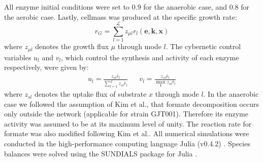 \documentclass[10pt,twocolumn,twoside,final]{IEEEtran}
\begin{document}
All enzyme initial conditions were set to 0.9 for the anaerobic case, and 0.8 for the aerobic case.
Lastly, cellmass was produced at the specific growth rate:
\begin{equation}
	r_{G}  = \sum_{l = 1}^{\mathcal{L}}z_{\mu l}r_{l}\left(\mathbf{e},\mathbf{k},\mathbf{x}\right)
\end{equation}
where $z_{\mu l}$ denotes the growth flux $\mu$ through mode $l$.
The cybernetic control variables $u_{l}$ and $v_{l}$, which control the synthesis and activity of each enzyme respectively, were given by:
\begin{align*}
	u_{l}  = \frac{z_{sl}\bar{r}_{l}}{\sum\limits_{l = 1}^{\mathcal{L}}z_{sl}\bar{r}_{l}} && v_{l} = \frac{z_{sl}\bar{r}_{l}}{\max\limits_{\mathbf{l}} z_{sl}\bar{r}_{l}}
\end{align*}
where $z_{sl}$ denotes the uptake flux of substrate $x$ through mode $l$.
In the anaerobic case we followed the assumption of Kim et al.\cite{2008_kim_varner_ramkrishna_BiotechProg},
that formate decomposition occurs only outside the network (applicable for strain GJT001).
Therefore its enzyme activity was assumed to be at its maximum level of unity.
The reaction rate for formate was also modified following Kim et al.\cite{2008_kim_varner_ramkrishna_BiotechProg}.
All numerical simulations were conducted in the high-performance computing language Julia (v0.4.2) \cite{Julia}.
Species balances were solved using the SUNDIALS package for Julia \cite{Sundials}.
\end{document}
